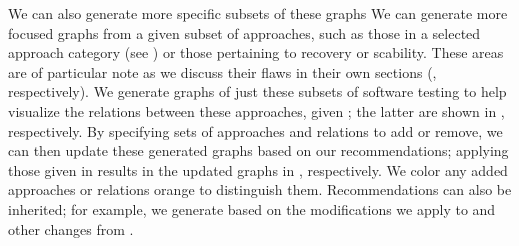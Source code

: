     We can also generate more specific subsets of these graphs
\else We can generate more focused graphs \fi from a given subset of
approaches, such as \ifnotpaper\else those in a selected approach category
    (see ) or \fi those pertaining to recovery or
scability\ifnotpaper. These areas are of particular note as we discuss their
flaws in their own sections (, respectively).
We generate graphs of just these subsets of software testing to help visualize
the relations between these approaches, given \else; the latter are shown \fi
in , respectively. By
specifying sets of approaches and relations to add or remove, we can then
update these generated graphs based on our recommendations; applying those
given in 
results in the updated graphs in , respectively.
We color any added approaches or relations orange to distinguish them.
Recommendations can also be inherited; for example, we generate
 based on the modifications we apply to
 and
other changes from .

\ifnotpaper
    
\else
    \flawMnfstsTable{}
    \flawDmnsTable{}
\fi
